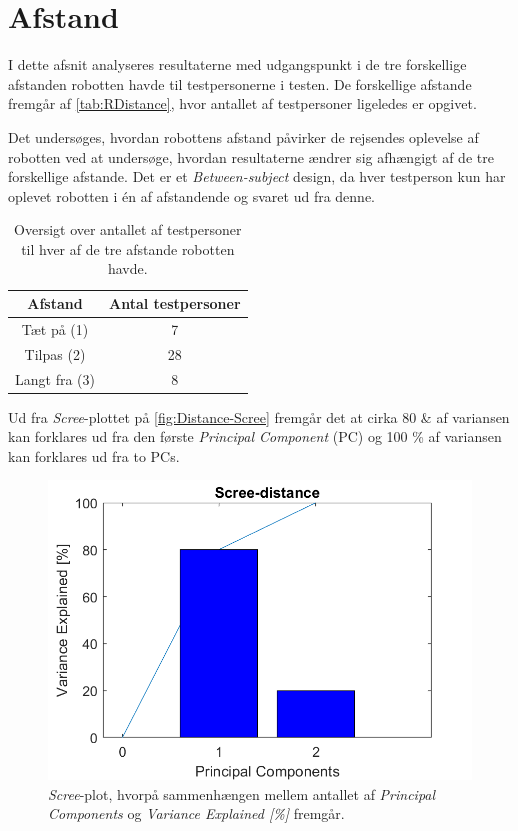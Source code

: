 \section{Afstand}
\label{DatabehandlingRAfstand}
%
I dette afsnit analyseres resultaterne med udgangspunkt i de tre forskellige afstanden robotten havde til testpersonerne i testen. De forskellige afstande fremgår af \autoref{tab:RDistance}, hvor antallet af testpersoner ligeledes er opgivet. 

Det undersøges, hvordan robottens afstand påvirker de rejsendes oplevelse af robotten ved at undersøge, hvordan resultaterne ændrer sig afhængigt af de tre forskellige afstande. Det er et \textit{Between-subject} design, da hver testperson kun har oplevet robotten i én af afstandende og svaret ud fra denne.
%
\begin{table}[H]
\centering
\begin{tabular}{c|c}
Afstand & Antal testpersoner \\ \hline
Tæt på (1) & 7    \\ \hline
Tilpas (2) & 28    \\ \hline
Langt fra (3) & 8     \\ 
\end{tabular}
\caption{Oversigt over antallet af testpersoner til hver af de tre afstande robotten havde.}
\label{tab:RDistance}
\end{table}
\noindent
%
Ud fra \textit{Scree}-plottet på \autoref{fig:Distance-Scree} fremgår det at cirka 80 \& af variansen kan forklares ud fra den første \textit{Principal Component} (PC) og 100 \% af variansen kan forklares ud fra to PCs. 
%
\begin{figure}[H]
\centering
\includegraphics[width=\textwidth]{Figure/DatabehandlingSkalaer/PCAfigures/Distance-Scree.png}
\caption{\textit{Scree}-plot, hvorpå sammenhængen mellem antallet af \textit{Principal Components} og \textit{Variance Explained [\%]} fremgår.}
\label{fig:Distance-Scree}
\end{figure}
